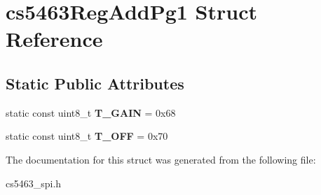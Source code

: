 \hypertarget{structcs5463RegAddPg1}{\section{cs5463\-Reg\-Add\-Pg1 Struct Reference}
\label{structcs5463RegAddPg1}
}
\subsection*{Static Public Attributes}
\begin{DoxyCompactItemize}
\item 
\hypertarget{structcs5463RegAddPg1_a6e070f039786446822662d364b873920}{static const uint8\-\_\-t {\bfseries T\-\_\-\-G\-A\-I\-N} = 0x68}\label{structcs5463RegAddPg1_a6e070f039786446822662d364b873920}

\item 
\hypertarget{structcs5463RegAddPg1_a586627a284f1338c106840eb0b4f17e6}{static const uint8\-\_\-t {\bfseries T\-\_\-\-O\-F\-F} = 0x70}\label{structcs5463RegAddPg1_a586627a284f1338c106840eb0b4f17e6}

\end{DoxyCompactItemize}


The documentation for this struct was generated from the following file\-:\begin{DoxyCompactItemize}
\item 
cs5463\-\_\-spi.\-h\end{DoxyCompactItemize}
